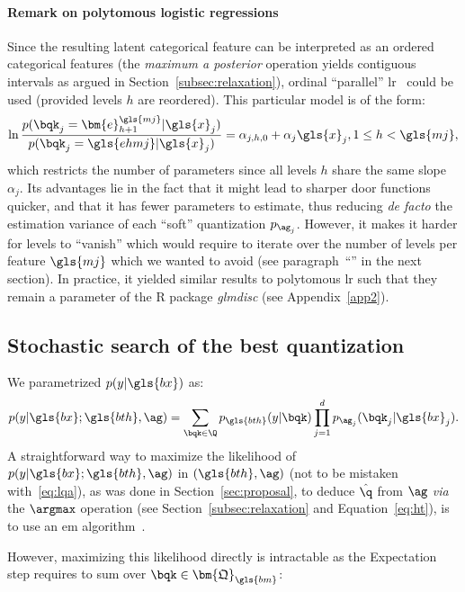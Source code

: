 \paragraph{Remark on polytomous logistic regressions}

Since the resulting latent categorical feature can be interpreted as an ordered categorical features (the \textit{maximum a posterior} operation yields contiguous intervals as argued in Section~\ref{subsec:relaxation}), ordinal ``parallel'' \gls{lr}~\cite{o2006logistic} could be used (provided levels $h$ are reordered). This particular model is of the form:
\[ \ln \frac{p(\bqk_{j} = \bm{e}_{h+1}^{\gls{mj}} | \gls{x}_j)}{p(\bqk_{j} = \gls{ehmj} | \gls{x}_j)} = \alpha_{j,h,0} + \alpha_{j} \gls{x}_j, 1 \leq h < \gls{mj}, \]
which restricts the number of parameters since all levels $h$ share the same slope $\alpha_j$. Its advantages lie in the fact that it might lead to sharper door functions quicker, and that it has fewer parameters to estimate, thus reducing \textit{de facto} the estimation variance of each ``soft'' quantization $p_{\ag_j}$. However, it makes it harder for levels to ``vanish'' which would require to iterate over the number of levels per feature $\gls{mj}$ which we wanted to avoid (see paragraph~``'' in the next section). In practice, it yielded similar results to polytomous \gls{lr} such that they remain a parameter of the \textsf{R} package \textit{glmdisc} (see Appendix~\ref{app2}).

\subsection{Stochastic search of the best quantization} \label{subsec:stoch}

We parametrized $p(y|\gls{bx})$ as:
\begin{equation}
p(y | \gls{bx}; \gls{bth}, \ag) = \sum_{\bqk \in \Q} p_{\gls{bth}}(y | \bqk) \prod_{j=1}^d p_{\ag_j}(\bqk_j | \gls{bx}_j).
\end{equation}
A straightforward way to maximize the likelihood of $p(y | \gls{bx}; \gls{bth}, \ag)$ in $(\gls{bth}, \ag)$ (not to be mistaken with~\eqref{eq:lqa}), as was done in Section~\ref{sec:proposal}, to deduce $\hat{\q}$ from $\ag$ \textit{via} the $\argmax$ operation (see Section~\ref{subsec:relaxation} and Equation~\eqref{eq:ht}), is to use an \gls{em} algorithm~\cite{dempster1977maximum}.

However, maximizing this likelihood directly is intractable as the Expectation step requires to sum over $\bqk \in \bm{\mathfrak{Q}}_{\gls{bm}}$:

